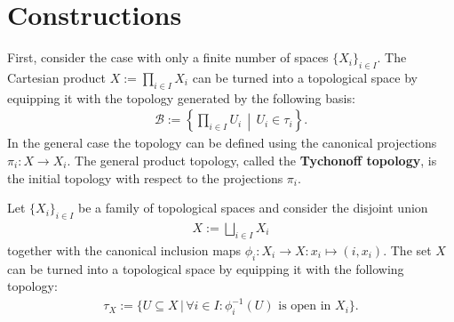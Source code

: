 
\section{Constructions}

    \begin{construct}\label{topology:tychonoff_topology}
        First, consider the case with only a finite number of spaces $\{X_i\}_{i\in I}$. The Cartesian product $X:=\prod_{i\in I}X_i$ can be turned into a topological space by equipping it with the topology generated by the following basis:
        \begin{gather}
            \mathcal{B} := \left\{\prod_{i\in I}U_i\,\middle\vert\,U_i\in\tau_i\right\}.
        \end{gather}
        In the general case the topology can be defined using the canonical projections $\pi_i:X\rightarrow X_i$. The general product topology, called the \textbf{Tychonoff topology}, is the initial topology with respect to the projections $\pi_i$.
    \end{construct}

    \begin{construct}\label{topology:disjoint_union}
        Let $\{X_i\}_{i\in I}$ be a family of topological spaces and consider the disjoint union
        \begin{gather}
            X := \bigsqcup_{i\in I}X_i
        \end{gather}
        together with the canonical inclusion maps $\phi_i:X_i\rightarrow X:x_i\mapsto(i,x_i)$. The set $X$ can be turned into a topological space by equipping it with the following topology:
        \begin{gather}
            \tau_X := \big\{U\subseteq X\,\big\vert\,\forall i\in I:\phi_i^{-1}(U)\text{ is open in }X_i\big\}.
        \end{gather}
    \end{construct}

